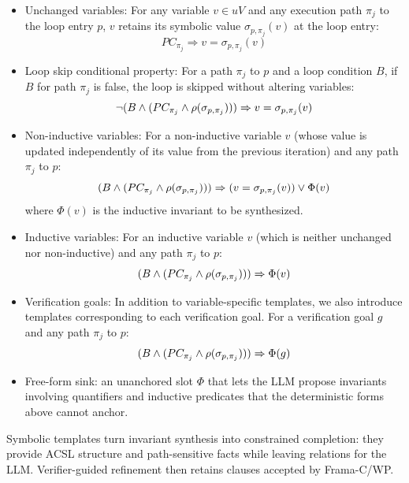 \begin{itemize}
    \item Unchanged variables:
For any variable $v \in uV$ and any execution path $\pi_j$ to the loop entry $p$, $v$ retains its symbolic value $\sigma_{p, \pi_j}(v)$ at the loop entry:
\[ PC_{\pi_j} \Rightarrow v = \sigma_{p, \pi_j}(v) \]


\item Loop skip conditional property: 
For a path $\pi_j$ to $p$ and a loop condition $B$, if $B$ for path $\pi_j$ is false, the loop is skipped without altering variables:
\[\neg (B \land (PC_{\pi_j} \land \rho(\sigma_{p, \pi_j}))) \Rightarrow v = \sigma_{p, \pi_j}(v)\]



\item Non-inductive variables: 
For a non-inductive variable $v$ (whose value is updated independently of its value from the previous iteration) and any path $\pi_j$ to $p$:
\[(B \land (PC_{\pi_j} \land \rho(\sigma_{p, \pi_j}))) \Rightarrow (v = \sigma_{p, \pi_j}(v)) \lor \Phi(v)\]
where $\Phi(v)$ is the inductive invariant to be synthesized.


\item Inductive variables: 
For an inductive variable $v$ (which is neither unchanged nor non-inductive) and any path $\pi_j$ to $p$:
\[ (B \land (PC_{\pi_j} \land \rho(\sigma_{p, \pi_j}))) \Rightarrow \Phi(v) \]

\item Verification goals:
In addition to variable-specific templates, we also introduce templates corresponding to each verification goal.
For a verification goal $g$ and any path $\pi_j$ to $p$:
\[ (B \land (PC_{\pi_j} \land \rho(\sigma_{p, \pi_j}))) \Rightarrow \Phi(g)
\]

\item Free-form sink: an unanchored slot $\Phi$ that lets the LLM propose invariants involving quantifiers and inductive predicates that the deterministic forms above cannot anchor.

\end{itemize}









Symbolic templates turn invariant synthesis into constrained completion: they provide ACSL structure and path-sensitive facts while leaving relations for the LLM. Verifier-guided refinement then retains clauses accepted by Frama-C/WP.

